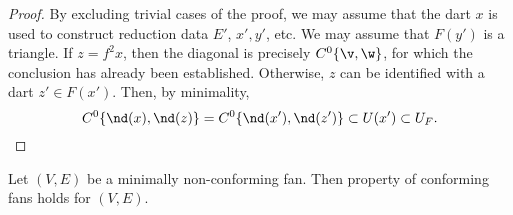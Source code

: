 \begin{proof}  
  By excluding trivial cases of the proof, we may assume that the dart $x$ 
  is used to construct reduction data $E'$, $x',y'$, etc. We may
  assume that $F(y')$ is a triangle.  If $z=f^2x$, then the diagonal
  is precisely $C^0\{\v,\w\}$, for which the conclusion has already
  been established.  Otherwise, $z$ can be identified with a dart
  $z'\in F(x')$.  Then, by minimality,
\begin{displaymath}
C^0\{\nd(x),\nd(z)\} = C^0\{\nd(x'),\nd(z')\} \subset U(x') \subset U_F.
\end{displaymath}
\end{proof}


\begin{lemma}[] Let $(V,E)$ be a minimally non-conforming fan.  Then property  of conforming fans
holds for $(V,E)$.
\end{lemma}
%

